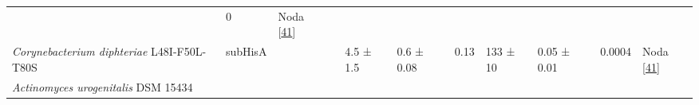 \documentclass[12pt,twoside]{reedthesis}
\begin{document}
\begin{longtable}[]{@{}lllllllllll@{}}
\begin{minipage}[t]{0.05\columnwidth}
  \strut
  \end{minipage} & \begin{minipage}[t]{0.03\columnwidth}\raggedright\strut
  0\strut
  \end{minipage} & \begin{minipage}[t]{0.11\columnwidth}\raggedright\strut
  Noda {[}\protect\hyperlink{ref-noda-garcia_evolution_2013}{41}{]}\strut
  \end{minipage}\tabularnewline
  \begin{minipage}[t]{0.15\columnwidth}\raggedright\strut
  \emph{Corynebacterium diphteriae} L48I-F50L-T80S\strut
  \end{minipage} & \begin{minipage}[t]{0.05\columnwidth}\raggedright\strut
  subHisA\strut
  \end{minipage} & \begin{minipage}[t]{0.04\columnwidth}\raggedright\strut
  \strut
  \end{minipage} & \begin{minipage}[t]{0.04\columnwidth}\raggedright\strut
  \strut
  \end{minipage} & \begin{minipage}[t]{0.06\columnwidth}\raggedright\strut
  4.5 ± 1.5\strut
  \end{minipage} & \begin{minipage}[t]{0.06\columnwidth}\raggedright\strut
  0.6 ± 0.08\strut
  \end{minipage} & \begin{minipage}[t]{0.06\columnwidth}\raggedright\strut
  0.13\strut
  \end{minipage} & \begin{minipage}[t]{0.05\columnwidth}\raggedright\strut
  133 ± 10\strut
  \end{minipage} & \begin{minipage}[t]{0.05\columnwidth}\raggedright\strut
  0.05 ± 0.01\strut
  \end{minipage} & \begin{minipage}[t]{0.03\columnwidth}\raggedright\strut
  0.0004\strut
  \end{minipage} & \begin{minipage}[t]{0.11\columnwidth}\raggedright\strut
  Noda {[}\protect\hyperlink{ref-noda-garcia_evolution_2013}{41}{]}\strut
  \end{minipage}\tabularnewline
  \begin{minipage}[t]{0.15\columnwidth}\raggedright\strut
  \emph{Actinomyces urogenitalis} DSM 15434\strut

\end{minipage}
\end{longtable}
\end{document}

